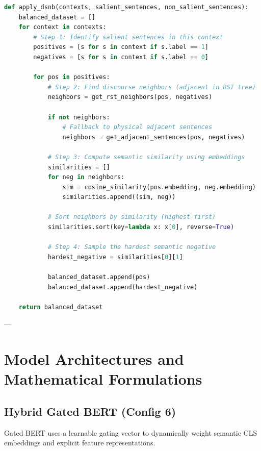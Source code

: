 \documentclass[11pt,a4paper]{article}
\begin{document}
\begin{lstlisting}[language=Python, caption=DSNB Negative Sampling Algorithm]
def apply_dsnb(contexts, salient_sentences, non_salient_sentences):
    balanced_dataset = []
    for context in contexts:
        # Step 1: Identify salient sentences in this context
        positives = [s for s in context if s.label == 1]
        negatives = [s for s in context if s.label == 0]
        
        for pos in positives:
            # Step 2: Find discourse neighbors (adjacent in RST tree)
            neighbors = get_rst_neighbors(pos, negatives)
            
            if not neighbors:
                # Fallback to physical adjacent sentences
                neighbors = get_adjacent_sentences(pos, negatives)
                
            # Step 3: Compute semantic similarity using embeddings
            similarities = []
            for neg in neighbors:
                sim = cosine_similarity(pos.embedding, neg.embedding)
                similarities.append((sim, neg))
                
            # Sort neighbors by similarity (highest first)
            similarities.sort(key=lambda x: x[0], reverse=True)
            
            # Step 4: Sample the hardest semantic negative
            hardest_negative = similarities[0][1]
            
            balanced_dataset.append(pos)
            balanced_dataset.append(hardest_negative)
            
    return balanced_dataset
\end{lstlisting}

---

\section{Model Architectures and Mathematical Formulations}

\subsection{Hybrid Gated BERT (Config 6)}
Gated BERT uses a learnable gating vector to dynamically weight semantic CLS embeddings and explicit feature representations.
\end{document}
